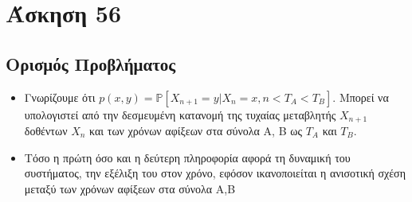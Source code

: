 \documentclass[a4paper,oneside, 11pt]{article}
\begin{document}
\section*{Άσκηση 56}
\subsection*{Ορισμός Προβλήματος}
\begingroup
\begin{itemize}
	\item Γνωρίζουμε ότι $p(x,y) = \mathbb{P}[X_{n+1} = y | X_n = x, n < T_A < T_B] $. Μπορεί να υπολογιστεί από την δεσμευμένη κατανομή της τυχαίας μεταβλητής $X_{n+1}$ δοθέντων $X_n$ και των χρόνων αφίξεων στα σύνολα Α, Β ως $T_A$ και $T_B$.
	\item Τόσο η πρώτη όσο και η δεύτερη πληροφορία αφορά τη δυναμική του συστήματος, την εξέλιξη του στον χρόνο, εφόσον ικανοποιείται η ανισοτική σχέση μεταξύ των χρόνων αφίξεων στα σύνολα Α,Β
\end{itemize}
\endgroup
\end{document}
